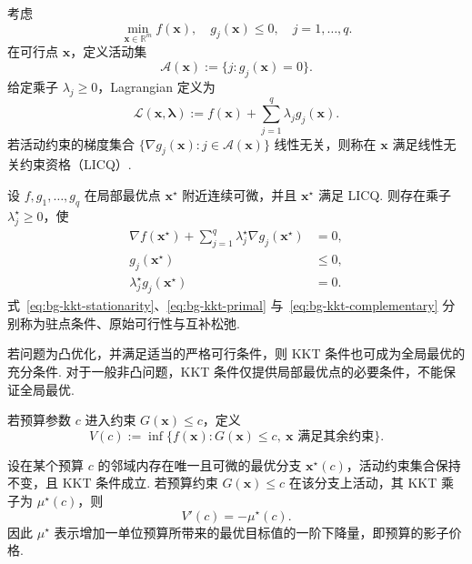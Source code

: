 \begin{definition}\label{def:bg-kkt-objects}
考虑
\begin{equation}\label{eq:bg-general-nlp}
\min_{\mathbf x\in\mathbb R^m} f(\mathbf x),
\quad g_j(\mathbf x)\le0,\quad j=1,\ldots,q.
\end{equation}
在可行点 $\mathbf x$，定义活动集
\[
\mathcal A(\mathbf x):=\{j:g_j(\mathbf x)=0\}.
\]
给定乘子 $\lambda_j\ge0$，Lagrangian 定义为
\[
\mathscr L(\mathbf x,\boldsymbol\lambda)
:=f(\mathbf x)+\sum_{j=1}^{q}\lambda_jg_j(\mathbf x).
\]
若活动约束的梯度集合
$\{\nabla g_j(\mathbf x):j\in\mathcal A(\mathbf x)\}$
线性无关，则称在 $\mathbf x$ 满足线性无关约束资格（LICQ）. 
\end{definition}

\begin{theorem}\label{thm:bg-kkt}
设 $f,g_1,\ldots,g_q$ 在局部最优点 $\mathbf x^\star$ 附近连续可微，并且 $\mathbf x^\star$ 满足 LICQ. 则存在乘子 $\lambda_j^\star\ge0$，使
\begin{align}
\nabla f(\mathbf x^\star)+\sum_{j=1}^{q}\lambda_j^\star\nabla g_j(\mathbf x^\star)&=0,\label{eq:bg-kkt-stationarity}\\
g_j(\mathbf x^\star)&\le0,\label{eq:bg-kkt-primal}\\
\lambda_j^\star g_j(\mathbf x^\star)&=0.\label{eq:bg-kkt-complementary}
\end{align}
式~\eqref{eq:bg-kkt-stationarity}、\eqref{eq:bg-kkt-primal} 与~\eqref{eq:bg-kkt-complementary} 分别称为驻点条件、原始可行性与互补松弛\cite{boyd,bonnans}. 
\end{theorem}

\begin{remark}
若问题为凸优化，并满足适当的严格可行条件，则 KKT 条件也可成为全局最优的充分条件\cite{boyd}. 对于一般非凸问题，KKT 条件仅提供局部最优点的必要条件，不能保证全局最优. 
\end{remark}

\begin{definition}[参数化最优值函数]\label{def:background-value}
若预算参数 $c$ 进入约束 $G(\mathbf x)\le c$，定义
\[
V(c):=\inf\{f(\mathbf x):G(\mathbf x)\le c,\ \mathbf x\text{ 满足其余约束}\}.
\]
\end{definition}

\begin{proposition}[活动预算约束的局部灵敏度]\label{thm:bg-envelope}
设在某个预算 $c$ 的邻域内存在唯一且可微的最优分支 $\mathbf x^\star(c)$，活动约束集合保持不变，且 KKT 条件成立. 若预算约束 $G(\mathbf x)\le c$ 在该分支上活动，其 KKT 乘子为 $\mu^\star(c)$，则
\begin{equation}\label{eq:bg-shadow-price}
V'(c)=-\mu^\star(c).
\end{equation}
因此 $\mu^\star$ 表示增加一单位预算所带来的最优目标值的一阶下降量，即预算的影子价格. 
\end{proposition}


